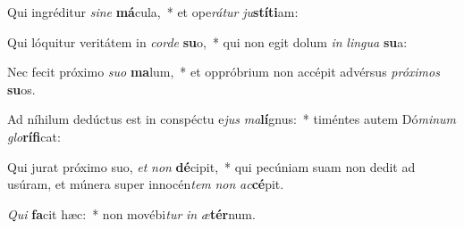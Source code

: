\item Qui ingréditur \textit{sine} \textbf{má}cula,~* et ope\textit{rátur} \textit{ju}\textbf{stíti}am:
\item Qui lóquitur veritátem in \textit{corde} \textbf{su}o,~* qui non egit dolum \textit{in} \textit{lingua} \textbf{su}a:
\item Nec fecit próximo \textit{suo} \textbf{ma}lum,~* et oppróbrium non accépit advérsus \textit{próximos} \textbf{su}os.
\item Ad níhilum dedúctus est in conspéctu e\textit{jus} \textit{ma}\textbf{lí}gnus:~* timéntes autem Dó\textit{minum} \textit{glo}\textbf{rífi}cat:
\item Qui jurat próximo suo, \textit{et} \textit{non} \textbf{dé}cipit,~* qui pecúniam suam non dedit ad usúram, et múnera super innocén\textit{tem} \textit{non} \textit{ac}\textbf{cé}pit.
\item \textit{Qui} \textbf{fa}cit hæc:~* non movébi\textit{tur} \textit{in} \textit{æ}\textbf{tér}num.

